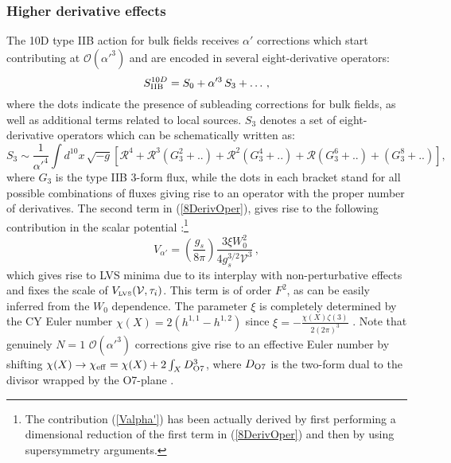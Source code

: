 \documentclass[11pt,a4paper]{article}
\newcommand{\be}{\begin{equation}}
\newcommand{\ee}{\end{equation}}
\def\LVS{{\scriptscriptstyle \rm LVS}}
\newcommand\vo{{\mathcal{V}}}
\newcommand{\mc}{\mathcal}
\begin{document}
\subsubsection{Higher derivative effects}

The 10D type IIB action for bulk fields receives $\alpha'$ corrections which start contributing at $\mc{O}(\alpha'^3)$ and are encoded in several eight-derivative operators:
\be
S_{\rm IIB}^{10D} = S_0 + \alpha'^3 \, S_3 + \dots\,,
\ee
where the dots indicate the presence of subleading corrections for bulk fields, as well as additional terms related to local sources. $S_3$ denotes a set of eight-derivative operators which can be schematically written as:
\be
S_3\sim \frac{1}{\alpha'^4} \int d^{10}x \, \sqrt{-g} \left[\mc{R}^4 + \mc{R}^3 \left(G_3^2 + ..\right) + \mc{R}^2 \left(G_3^4 + ..\right) + \mc{R} \left(G_3^6 + ..\right) + \left(G_3^8 + ..\right) \right],
\label{8DerivOper}
\ee
where $G_3$ is the type IIB 3-form flux, while the dots in each bracket stand for all possible combinations of fluxes giving rise to an operator with the proper number of derivatives. The second term in (\ref{8DerivOper}), gives rise to the following contribution in the scalar potential \cite{Becker:2002nn}:\footnote{The contribution (\ref{Valpha'}) has been actually derived by first performing a dimensional reduction of the first term in (\ref{8DerivOper}) and then by using supersymmetry arguments.}
\be 
V_{\alpha'} = \left(\frac{g_s}{8 \pi}\right) \frac{3 \xi W_0^2}{4 g_s^{3/2} \vo^3}\,,
\label{Valpha'}
\ee 
which gives rise to LVS minima due to its interplay with non-perturbative effects and fixes the scale of $V_\LVS(\vo,\tau_i)$. This term is of order $F^2$, as can be easily inferred from the $W_0$ dependence. The parameter $\xi$ is completely determined by the CY Euler number $\chi(X)=2(h^{1,1}-h^{1,2})$ since $\xi=-\frac{\chi(X) \zeta(3)}{2(2\pi)^3}$ \cite{Becker:2002nn}. Note that genuinely $N=1$ $\mc{O}(\alpha'^3)$ corrections give rise to an effective Euler number by shifting $\chi(X) \rightarrow \chi_{\rm eff} = \chi(X) + 2 \int_X  D_{\rm O7}^3$, where $D_{\rm O7}$ is the two-form dual to the divisor wrapped by the O7-plane \cite{Minasian:2015bxa}. 
\end{document}
